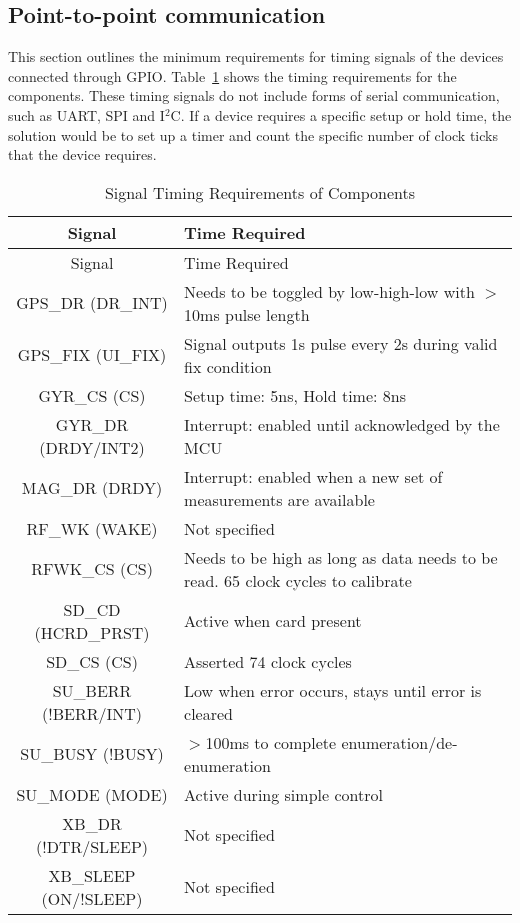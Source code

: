   
  
\subsection{Point-to-point communication}
This section outlines the minimum requirements for timing signals of the devices connected through GPIO. Table~\ref{tab:timeReqs} shows the timing requirements for the components. These timing signals do not include forms of serial communication, such as UART, SPI and I$^2$C. If a device requires a specific setup or hold time, the solution would be to set up a timer and count the specific number of clock ticks that the device requires. 


\begin{center}
    \begin{longtable}{|c|p{3in}|}
    \caption{Signal Timing Requirements of Components  \label{tab:timeReqs}} \\

     \hline
    \rowcolor{Gray}
   Signal  & Time Required \\
    \hline \endfirsthead
    
         \hline
    \rowcolor{Gray}
    Signal  & Time Required \\
    \hline \endhead
    
    \endfoot

    GPS\_DR (DR\_INT) & Needs to be toggled by low-high-low with $>$10ms pulse length \\ \hline
    GPS\_FIX (UI\_FIX) & Signal outputs 1s pulse every 2s during valid fix condition \\ \hline
    GYR\_CS (CS) & Setup time: 5ns, Hold time: 8ns \\ \hline
    GYR\_DR (DRDY/INT2) & Interrupt: enabled until acknowledged by the MCU \\ \hline
    MAG\_DR (DRDY) & Interrupt: enabled when a new set of measurements are available \\ \hline
    RF\_WK (WAKE) & Not specified \\ \hline
    RFWK\_CS (CS) & Needs to be high as long as data needs to be read. 65 clock cycles to calibrate \\ \hline
    SD\_CD (HCRD\_PRST) & Active when card present \\ \hline
    SD\_CS (CS) & Asserted 74 clock cycles \\ \hline
    SU\_BERR (!BERR/INT) & Low when error occurs, stays until error is cleared \\ \hline
    SU\_BUSY (!BUSY) & $>$100ms to complete enumeration/de-enumeration \\ \hline
    SU\_MODE (MODE) & Active during simple control \\ \hline
    XB\_DR (!DTR/SLEEP) & Not specified \\ \hline
    XB\_SLEEP (ON/!SLEEP) & Not specified \\ \hline
    \end{longtable}%

\end{center}%
